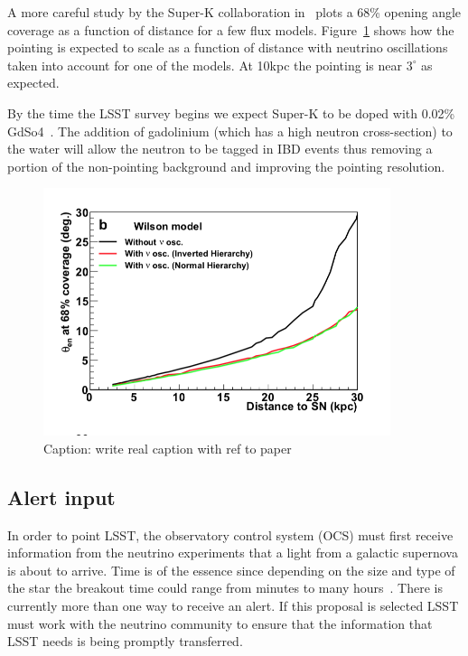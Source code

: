 \documentclass[11pt, letterpaper]{article}
\newcommand{\superk}  {Super\nobreakdash-K\xspace}
\begin{document}
A more careful study by the \superk collaboration
in~\cite{2016APh....81...39A} plots a 68\% opening angle coverage as a
function of distance for a few flux
models. Figure~\ref{fig:SK-realtime-pointing-resolution} shows how the
pointing is expected to scale as a function of distance with neutrino
oscillations taken into account for one of the models. At 10kpc the
pointing is near $3^\circ$ as expected.

By the time the LSST survey begins we expect \superk to be doped with
0.02\% GdSo4~\cite{2018JCAP...04..025B}.  The addition of gadolinium
(which has a high neutron cross-section) to the water will allow the
neutron to be tagged in IBD events thus removing a portion of the
non-pointing background and improving the pointing resolution.

\begin{figure}
  \begin{center}
    \includegraphics[width=4.0in]{SK-realtime-pointing-resolution}
    \caption{Caption: write real caption with ref to paper}
    \label{fig:SK-realtime-pointing-resolution}
  \end{center}
\end{figure}

\subsection{Alert input}

In order to point LSST, the observatory control system (OCS) must
first receive information from the neutrino experiments that a light
from a galactic supernova is about to arrive.  Time is of the essence
since depending on the size and type of the star the breakout time
could range from minutes to many hours~\cite{2013ApJ...778...81K}.
There is currently more than one way to receive an alert. If this
proposal is selected LSST must work with the neutrino community to
ensure that the information that LSST needs is being promptly
transferred.
\end{document}
